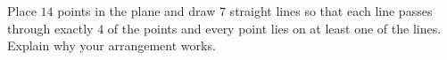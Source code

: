 Place $14$ points in the plane and draw $7$ straight lines so that each line passes through exactly $4$ of the points and every point lies on at least one of the lines. Explain why your arrangement works.

